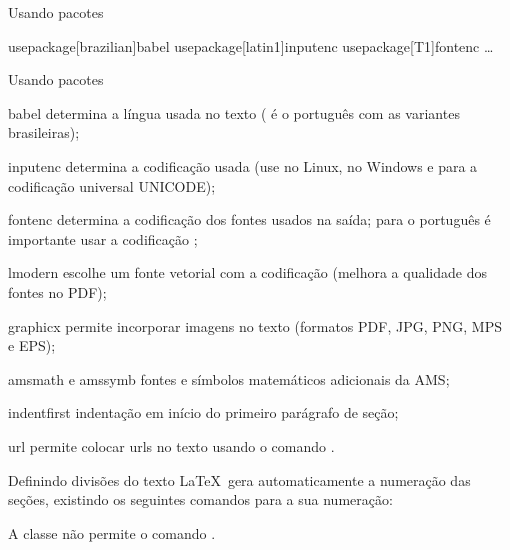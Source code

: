 \begin{frame}{Usando pacotes}
\begin{LaTeXcode}[Exemplo]
\n
\LOA usepackage[brazilian]{babel}\n
\LOA usepackage[latin1]{inputenc}\n
\LOA usepackage[T1]{fontenc}\n
{}\n
{}\n
{}\n
{}\n
{}\n
{}\n
\dots\n
{}
\end{LaTeXcode}
\end{frame}

\begin{frame}{Usando pacotes}\fontsize{10}{11}\selectfont
\begin{lista}
\item [babel] determina a língua usada no texto (  é o português com as variantes brasileiras);
\item [inputenc] determina a codificação usada (use   no Linux,  no Windows e  para a codificação universal UNICODE);
\item[fontenc] determina a codificação dos fontes usados na saída; para o português é importante usar a codificação ;
\item[lmodern] escolhe um fonte vetorial com a codificação  (melhora a qualidade dos fontes no PDF);
\item [graphicx] permite incorporar imagens no texto (formatos PDF, JPG, PNG, MPS e EPS);
\item [amsmath e amssymb] fontes e símbolos  matemáticos adicionais da AMS;
\item [indentfirst] indentação em início do primeiro parágrafo de seção;
\item [url] permite colocar urls no texto usando o comando .
\end{lista}

\end{frame}

\begin{frame}{Definindo divisões do texto}
\LaTeX\ gera automaticamente a numeração das seções, existindo os 
seguintes comandos para a sua numeração:

\begin{LaTeXcode}
\n
{}\n
{}\n
{}\n
{}\n
{}\n
{}
\end{LaTeXcode}

A classe  não permite o comando .
\end{frame}


